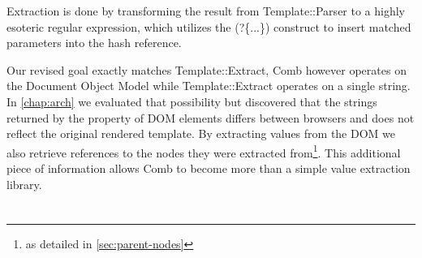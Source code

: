 \documentclass[thesis.tex]{subfiles}
\begin{document}
\begin{citequote}{\cite{TPLEXTRACT}}
Extraction is done by transforming the result from Template::Parser to a highly
esoteric regular expression, which utilizes the (?\{...\}) construct to insert
matched parameters into the hash reference.
\end{citequote}

Our revised goal exactly matches Template::Extract, Comb however operates on the
Document Object Model while Template::Extract operates on a single string.
In \ref{chap:arch} we evaluated that possibility but discovered that the strings
returned by the  property of DOM elements differs between
browsers and does not reflect the original rendered template.
By extracting values from the DOM we also retrieve references to the nodes they
were extracted from\footnote{
	as detailed in \ref{sec:parent-nodes}
}. This additional piece of information allows Comb to become more than a simple
value extraction library.

\section{}
\cite{DYNDOC}

\cite{HASKELL}
\cite{WASH}
\cite{ML}
\end{document}
